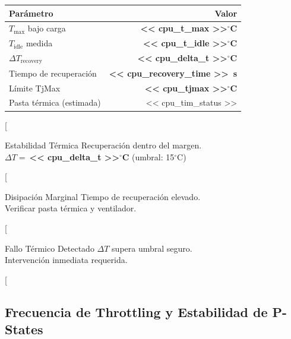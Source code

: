 \documentclass[11pt, a4paper, final]{article}
\newcommand{\mv}[1]{\textcolor{AMPrimary}{\textbf{#1}}}
\newcommand{\rowalt}{\rowcolor{AMLight}}
\newcommand{\thcell}[1]{\color{AMPrimary}\textbf{#1}}
\begin{document}
\hfill
\begin{minipage}[t]{0.39\textwidth} %
  \vspace{0pt}
  \small
  \begin{tabularx}{\linewidth}{@{}X r@{}}
    \toprule
    \thcell{Parámetro} & \thcell{Valor} \\
    \midrule
    $T_{\max}$ bajo carga        & \mv{<< cpu_t_max >>$^\circ$C} \\
    \rowalt
    $T_{\text{idle}}$ medida     & \mv{<< cpu_t_idle >>$^\circ$C} \\
    $\Delta T_{\text{recovery}}$ & \mv{<< cpu_delta_t >>$^\circ$C} \\
    \rowalt
    Tiempo de recuperación       & \mv{<< cpu_recovery_time >>\ s} \\
    Límite TjMax                 & \mv{<< cpu_tjmax >>$^\circ$C} \\
    \rowalt
    Pasta térmica (estimada)     & << cpu_tim_status >> \\
    \bottomrule
  \end{tabularx}

  \vspace{0.5cm}

  [%
  \begin{amboxok}{Estabilidad Térmica}
    \scriptsize Recuperación dentro del margen.\\
    $\Delta T =\ $\mv{<< cpu_delta_t >>$^\circ$C} (umbral: 15$^\circ$C)
  \end{amboxok}
  [%
  \begin{amboxwarn}{Disipación Marginal}
    \scriptsize Tiempo de recuperación elevado.\\
    Verificar pasta térmica y ventilador.
  \end{amboxwarn}
  [%
  \begin{amboxcrit}{Fallo Térmico Detectado}
    \scriptsize $\Delta T$ supera umbral seguro.\\
    Intervención inmediata requerida.
  \end{amboxcrit}
  [%
\end{minipage}


\subsection{Frecuencia de Throttling y Estabilidad de P-States}
\end{document}
